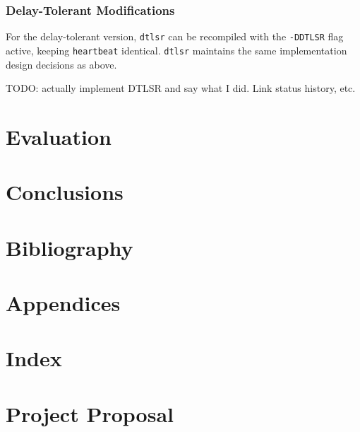 \documentclass[10pt,twoside,a4paper]{article}
\begin{document}
\subsubsection{Delay-Tolerant Modifications}

For the delay-tolerant version, \texttt{dtlsr} can be recompiled with the \texttt{-DDTLSR} flag active, keeping \texttt{heartbeat} identical. \texttt{dtlsr} maintains the same implementation design decisions as above.

TODO: actually implement DTLSR and say what I did. Link status history, etc.



\section{Evaluation}

\section{Conclusions}

\section{Bibliography}

\section{Appendices}

\section{Index}

\section{Project Proposal}
\end{document}
